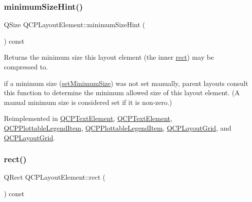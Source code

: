 \mbox{\label{class_q_c_p_layout_element_ab3fdb5c9a5189bb2dac10d4d25329cd8}} 
\subsubsection{\texorpdfstring{minimum\+Size\+Hint()}{minimumSizeHint()}}
{\footnotesize\ttfamily Q\+Size Q\+C\+P\+Layout\+Element\+::minimum\+Size\+Hint (\begin{DoxyParamCaption}{ }\end{DoxyParamCaption}) const\hspace{0.3cm}{\ttfamily [virtual]}}

Returns the minimum size this layout element (the inner \hyperlink{class_q_c_p_layout_element_a208effccfe2cca4a0eaf9393e60f2dd4}{rect}) may be compressed to.

if a minimum size (\hyperlink{class_q_c_p_layout_element_a5dd29a3c8bc88440c97c06b67be7886b}{set\+Minimum\+Size}) was not set manually, parent layouts consult this function to determine the minimum allowed size of this layout element. (A manual minimum size is considered set if it is non-\/zero.) 

Reimplemented in \hyperlink{class_q_c_p_text_element_a5b6e94c79d0cd56c13cbedbb7021ea08}{Q\+C\+P\+Text\+Element}, \hyperlink{class_q_c_p_text_element_a28c1113007c8990bf2c1a235b24381ef}{Q\+C\+P\+Text\+Element}, \hyperlink{class_q_c_p_plottable_legend_item_a923b8b0e2b888cbb00abae0783edf509}{Q\+C\+P\+Plottable\+Legend\+Item}, \hyperlink{class_q_c_p_plottable_legend_item_a07b5cd301f1ec07ae0d6e6dde1e564b3}{Q\+C\+P\+Plottable\+Legend\+Item}, \hyperlink{class_q_c_p_layout_grid_a361c3f5906c21a6709cb8daf5a9e019f}{Q\+C\+P\+Layout\+Grid}, and \hyperlink{class_q_c_p_layout_grid_a57515592661621cc07d027867bcfc4de}{Q\+C\+P\+Layout\+Grid}.

\mbox{\label{class_q_c_p_layout_element_a208effccfe2cca4a0eaf9393e60f2dd4}} 
\subsubsection{\texorpdfstring{rect()}{rect()}}
{\footnotesize\ttfamily Q\+Rect Q\+C\+P\+Layout\+Element\+::rect (\begin{DoxyParamCaption}{ }\end{DoxyParamCaption}) const\hspace{0.3cm}{\ttfamily [inline]}}

